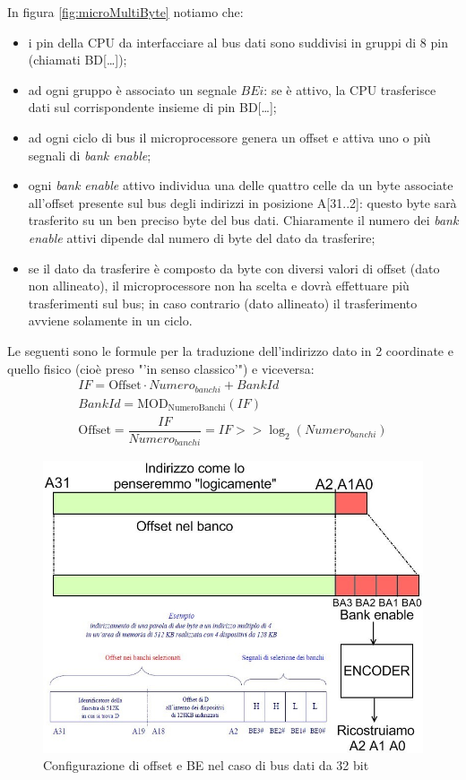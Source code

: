 In figura \ref{fig:microMultiByte} notiamo che:
\begin{itemize}
\item i pin della CPU da interfacciare al bus dati sono suddivisi in gruppi di 8 pin (chiamati BD[\ldots]);
\item ad ogni gruppo è associato un segnale $BEi$: se è attivo, la CPU trasferisce dati sul corrispondente insieme di pin BD[\ldots];
\item ad ogni ciclo di bus il microprocessore genera un offset e attiva uno o più segnali di \textit{bank enable};
\item ogni \textit{bank enable} attivo individua una delle quattro celle da un byte associate all'offset presente sul bus degli indirizzi in posizione A[31..2]: questo byte sarà trasferito su un ben preciso byte del bus dati. Chiaramente il numero dei  \textit{bank enable} attivi dipende dal numero di byte del dato da trasferire;
\item se il dato da trasferire è composto da byte con diversi valori di offset (dato non allineato), il
microprocessore non ha scelta e dovrà effettuare più trasferimenti sul bus; in caso contrario (dato allineato) il trasferimento avviene solamente in un ciclo.
\end{itemize}

Le seguenti sono le formule per la traduzione dell'indirizzo dato in 2 coordinate e quello fisico (cioè preso "'in senso classico'") e viceversa:
\[
\begin{gathered}
IF = \text{Offset} \cdot Numero_{banchi} + BankId \\
BankId = \operatorname{MOD_{NumeroBanchi}}(IF) \\
\text{Offset} = \dfrac{IF}{Numero_{banchi}} = IF >> \log_2\left( Numero_{banchi}\right)
\end{gathered}
\]

\begin{figure}[!h]
\centering
\includegraphics[width=0.85\columnwidth]{img/3234bit}
\caption{Configurazione di offset e BE nel caso di bus dati da 32 bit}
\label{fig:3234bit}
\end{figure}

